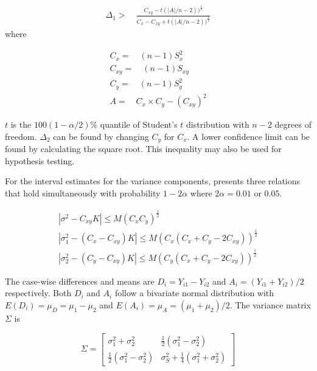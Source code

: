 \documentclass[12pt, a4paper]{report}
\theoremstyle{plain}
\theoremstyle{definition}
\theoremstyle{remark}
\begin{document}
\begin{eqnarray}
\Delta_{1} >\quad \frac{C_{xy}-
	t(|A|/n-2))^{\frac{1}{2}}}{C_{x}-C_{xy}+
	t(|A|/n-2))^{\frac{1}{2}}}
\end{eqnarray}
where

\begin{eqnarray}
C_{x}=\quad(n-1)S^2_{x}\nonumber\\
C_{xy}=\quad(n-1)S_{xy}\nonumber\\
C_{y}=\quad(n-1)S^2_{y}\nonumber\\
A=\quad C_{x}\times C_{y} - (C_{xy})^2 \nonumber
\end{eqnarray}

$t$ is the $100(1-\alpha/2)\%$ quantile of Student's $t$
distribution with $n-2$ degrees of freedom. $\Delta_{2}$ can be
found by changing $C_{y}$ for $C_{x}$. A lower confidence limit
can be found by calculating the square root. This inequality may
also be used for hypothesis testing.

For the interval estimates for the variance components,
\citet{Thompson} presents three relations that hold simultaneously
with probability $1-2\alpha$ where $2\alpha=0.01$ or $0.05$.

\begin{eqnarray}
|\sigma^2-C_{xy}K|\leqslant M(C_{x}C_{y})^{\frac{1}{2}}\\
|\sigma^2_{1}-(C_{x}-C_{xy})K|\leqslant M(C_{x}(C_{x}+C_{y}-2C_{xy}))^{\frac{1}{2}}\nonumber\\
|\sigma^2_{2}-(C_{y}-C_{xy})K|\leqslant
M(C_{y}(C_{x}+C_{y}-2C_{xy}))^{\frac{1}{2}}\nonumber
\end{eqnarray}

The case-wise differences and means are $D_{i} = Y_{i1}-Y_{i2}$
and $A_{i} = (Y_{i1}+Y_{i2})/2$  respectively. Both $D_{i}$ and
$A_{i}$ follow a bivariate normal distribution with $E(D_{i})=
\mu_{D} = \mu_{1} - \mu_{2}$ and $E(A_{i})= \mu_{A} = (\mu_{1} +
\mu_{2})/2$. The variance matrix $\Sigma$ is

\begin{equation}
\Sigma = \left[\begin{matrix}
\sigma^{2}_{1}+\sigma^{2}_{2}&\frac{1}{2}(\sigma^{2}_{1}-\sigma^{2}_{2})\\
\frac{1}{2}(\sigma^{2}_{1}-\sigma^{2}_{2})&\sigma^{2}_{S}+
\frac{1}{4}(\sigma^{2}_{1}+\sigma^{2}_{2})
\end{matrix} \right]
\end{equation}
\end{document}
